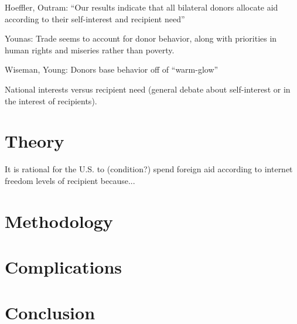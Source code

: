 \documentclass{article}
\begin{document}
Hoeffler, Outram: ``Our results indicate that all bilateral donors allocate aid according to their self-interest and recipient need''

Younas: Trade seems to account for donor behavior, along with priorities in human rights and miseries rather than poverty.

Wiseman, Young: Donors base behavior off of ``warm-glow''

National interests versus recipient need (general debate about self-interest or in the interest of recipients).


\section*{Theory}
It is rational for the U.S. to (condition?) spend foreign aid according to internet freedom levels of recipient because...

\section*{Methodology}


\section*{Complications}
 

\section*{Conclusion}


\pagebreak
\printbibliography
\end{document}

